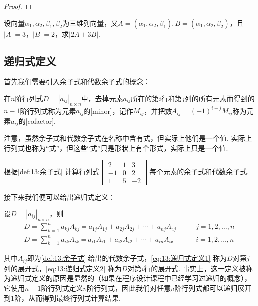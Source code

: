\begin{proof}

\end{proof}

\begin{example} \label{ex:13:公理化定义2}
    设向量$\alpha_1,\alpha_2,\beta_1,\beta_2$为三维列向量，又$A=(\alpha_1,\alpha_2,\beta_1),B=(\alpha_1,\alpha_2,\beta_2)$，且$|A|=3$，$|B|=2$，求$|2A+3B|$.
\end{example}

\begin{solution}

\end{solution}

\subsection{递归式定义}

首先我们需要引入余子式和代数余子式的概念：
\begin{definition} \label{def:13:余子式}
    在$n$阶行列式$D=|a_{ij}|_{n \times n}$中，去掉元素$a_{ij}$所在的第$i$行和第$j$列的所有元素而得到的$n-1$阶行列式称为元素$a_{ij}$的[minor]，记作$M_{ij}$，并把数$A_{ij}=(-1)^{i+j}M_{ij}$称为元素$a_{ij}$的[cofactor].
\end{definition}
注意，虽然余子式和代数余子式在名称中含有式，但实际上他们是一个值. 实际上行列式也称为``式''，但这些``式''只是形状上有个形式，实际上只是一个值.
\begin{example} \label{ex:13:余子式}
    根据\autoref{def:13:余子式} 计算行列式$\begin{vmatrix}
            2  & 1 & 3  \\
            -1 & 0 & 2  \\
            1  & 5 & -2
        \end{vmatrix}$每个元素的余子式和代数余子式.
\end{example}

\begin{solution}

\end{solution}

接下来我们便可以给出递归式定义：
\begin{definition} \label{def:13:递归式定义}
    设$D=|a_{ij}|_{n \times n}$，则
    \begin{align}
        \label{eq:13:递归式定义1}
        D=\sum_{k=1}^{n}a_{kj}A_{kj}=a_{1j}A_{1j}+a_{2j}A_{2j}+\cdots+a_{nj}A_{nj} & \qquad j=1,2,\ldots,n \\
        \label{eq:13:递归式定义2}
        D=\sum_{k=1}^{n}a_{ik}A_{ik}=a_{i1}A_{i1}+a_{i2}A_{i2}+\cdots+a_{in}A_{in} & \qquad i=1,2,\ldots,n
    \end{align}
\end{definition}
其中$A_{ij}$即为\autoref{def:13:余子式} 给出的代数余子式，\autoref{eq:13:递归式定义1} 称为$D$对第$j$列的展开式，\autoref{eq:13:递归式定义2} 称为$D$对第$i$行的展开式. 事实上，这一定义被称为递归式定义的原因是显然的（如果在程序设计课程中已经学习过递归的概念），它使用$n-1$阶行列式定义$n$阶行列式，因此我们对任意$n$阶行列式都可以递归展开到1阶，从而得到最终行列式计算结果.

